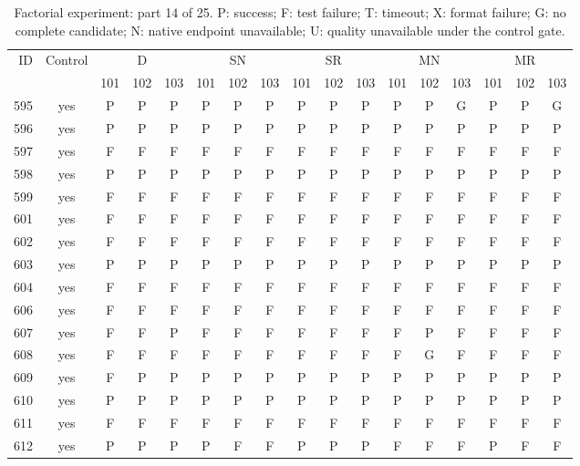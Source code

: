 \begin{table}[p]\centering\footnotesize
\setlength{\tabcolsep}{3pt}
\caption{Factorial experiment: part 14 of 25. P: success; F: test failure; T: timeout; X: format failure; G: no complete candidate; N: native endpoint unavailable; U: quality unavailable under the control gate.}
\begin{tabular*}{\textwidth}{@{\extracolsep{\fill}}rcccccccccccccccc}\toprule
ID & Control & \multicolumn{3}{c}{D} & \multicolumn{3}{c}{SN} & \multicolumn{3}{c}{SR} & \multicolumn{3}{c}{MN} & \multicolumn{3}{c}{MR}\\
\cmidrule(lr){3-5}\cmidrule(lr){6-8}\cmidrule(lr){9-11}\cmidrule(lr){12-14}\cmidrule(lr){15-17}
 & & 101 & 102 & 103 & 101 & 102 & 103 & 101 & 102 & 103 & 101 & 102 & 103 & 101 & 102 & 103\\\midrule
595 & yes & P & P & P & P & P & P & P & P & P & P & P & G & P & P & G\\
596 & yes & P & P & P & P & P & P & P & P & P & P & P & P & P & P & P\\
597 & yes & F & F & F & F & F & F & F & F & F & F & F & F & F & F & F\\
598 & yes & P & P & P & P & P & P & P & P & P & P & P & P & P & P & P\\
599 & yes & F & F & F & F & F & F & F & F & F & F & F & F & F & F & F\\
601 & yes & F & F & F & F & F & F & F & F & F & F & F & F & F & F & F\\
602 & yes & F & F & F & F & F & F & F & F & F & F & F & F & F & F & F\\
603 & yes & P & P & P & P & P & P & P & P & P & P & P & P & P & P & P\\
604 & yes & F & F & F & F & F & F & F & F & F & F & F & F & F & F & F\\
606 & yes & F & F & F & F & F & F & F & F & F & F & F & F & F & F & F\\
607 & yes & F & F & P & F & F & F & F & F & F & F & P & F & F & F & F\\
608 & yes & F & F & F & F & F & F & F & F & F & F & G & F & F & F & F\\
609 & yes & F & P & P & P & P & P & P & P & P & P & P & P & P & P & P\\
610 & yes & P & P & P & P & P & P & P & P & P & P & P & P & P & P & P\\
611 & yes & F & F & F & F & F & F & F & F & F & F & F & F & F & F & F\\
612 & yes & P & P & P & P & F & F & P & P & P & F & F & F & P & F & F\\

\end{tabular*}
\end{table}
